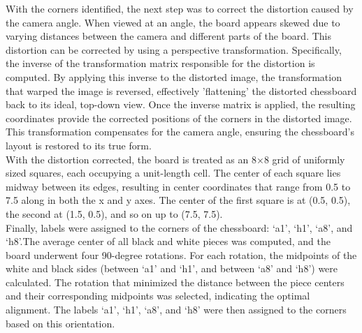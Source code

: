 With the corners identified, the next step was to correct the distortion caused by the camera angle. When viewed at an angle, the board appears skewed due to varying distances between the camera and different parts of the board. This distortion can be corrected by using a perspective transformation. Specifically, the inverse of the transformation matrix responsible for the distortion is computed. By applying this inverse to the distorted image, the transformation that warped the image is reversed, effectively 'flattening' the distorted chessboard back to its ideal, top-down view. Once the inverse matrix is applied, the resulting coordinates provide the corrected positions of the corners in the distorted image. This transformation compensates for the camera angle, ensuring the chessboard’s layout is restored to its true form. \\

With the distortion corrected, the board is treated as an 8×8 grid of uniformly sized squares, each occupying a unit-length cell. The center of each square lies midway between its edges, resulting in center coordinates that range from 0.5 to 7.5 along in both the x and y axes. The center of the first square is at (0.5, 0.5), the second at (1.5, 0.5), and so on up to (7.5, 7.5). \\

Finally, labels were assigned to the corners of the chessboard: ‘a1’, ‘h1’, ‘a8’, and ‘h8’.The average center of all black and white pieces was computed, and the board underwent four 90-degree rotations. For each rotation, the midpoints of the white and black sides (between ‘a1’ and ‘h1’, and between ‘a8’ and ‘h8’) were calculated. The rotation that minimized the distance between the piece centers and their corresponding midpoints was selected, indicating the optimal alignment. The labels ‘a1’, ‘h1’, ‘a8’, and ‘h8’ were then assigned to the corners based on this orientation.
 

